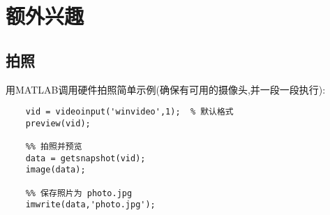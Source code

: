 \section{额外兴趣}

\subsection{拍照}
用MATLAB调用硬件拍照简单示例(确保有可用的摄像头,并一段一段执行):

  \vspace{-0.8cm}
  \begin{lstlisting}[caption = 拍照]
    %% 打开摄像头
    vid = videoinput('winvideo',1);  % 默认格式
    preview(vid);

    %% 拍照并预览
    data = getsnapshot(vid);
    image(data);

    %% 保存照片为 photo.jpg
    imwrite(data,'photo.jpg');
  \end{lstlisting}






